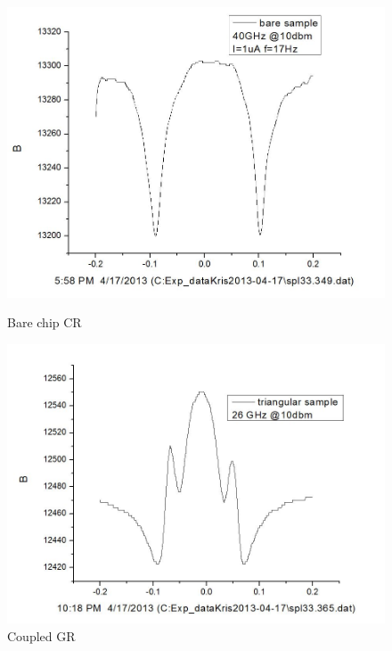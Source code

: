 \documentclass[12pt]{ruthesis}
\begin{document}
\begin{figure}[!htb]\centering
   \begin{minipage}{0.49\textwidth}
     \includegraphics[width=\linewidth]{figures/bare_cr.JPG}
     \caption{Bare chip CR}\label{bare_cr}
   \end{minipage}
   \begin {minipage}{0.49\textwidth}
     \includegraphics[width=\linewidth]{figures/coupled_cr.JPG}
     \caption{Coupled GR}\label{coupled_cr}
   \end{minipage}
\end{figure}
\end{document}
